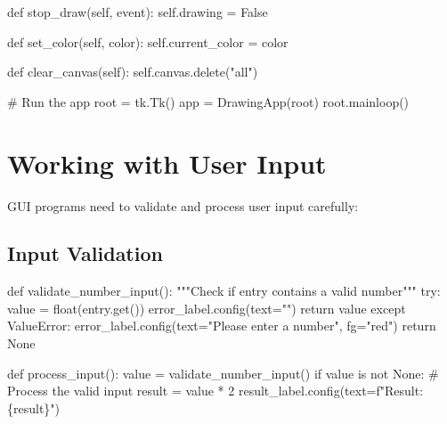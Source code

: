 \documentclass[
  letterpaper,
  DIV=11,
  numbers=noendperiod,
  oneside]{scrreprt}
\newenvironment{Shaded}{}{}
\newcommand{\BuiltInTok}[1]{\textcolor[rgb]{0.84,0.23,0.29}{#1}}
\newcommand{\CommentTok}[1]{\textcolor[rgb]{0.42,0.45,0.49}{#1}}
\newcommand{\ControlFlowTok}[1]{\textcolor[rgb]{0.84,0.23,0.29}{#1}}
\newcommand{\DecValTok}[1]{\textcolor[rgb]{0.00,0.36,0.77}{#1}}
\newcommand{\KeywordTok}[1]{\textcolor[rgb]{0.84,0.23,0.29}{#1}}
\newcommand{\NormalTok}[1]{\textcolor[rgb]{0.14,0.16,0.18}{#1}}
\newcommand{\OperatorTok}[1]{\textcolor[rgb]{0.14,0.16,0.18}{#1}}
\newcommand{\PreprocessorTok}[1]{\textcolor[rgb]{0.84,0.23,0.29}{#1}}
\newcommand{\SpecialCharTok}[1]{\textcolor[rgb]{0.00,0.36,0.77}{#1}}
\newcommand{\SpecialStringTok}[1]{\textcolor[rgb]{0.01,0.18,0.38}{#1}}
\newcommand{\StringTok}[1]{\textcolor[rgb]{0.01,0.18,0.38}{#1}}
\newcommand{\VariableTok}[1]{\textcolor[rgb]{0.89,0.38,0.04}{#1}}
\begin{document}
\begin{Shaded}
\begin{Highlighting}[]
    \KeywordTok{def}\NormalTok{ stop\_draw(}\VariableTok{self}\NormalTok{, event):}
        \VariableTok{self}\NormalTok{.drawing }\OperatorTok{=} \VariableTok{False}
        
    \KeywordTok{def}\NormalTok{ set\_color(}\VariableTok{self}\NormalTok{, color):}
        \VariableTok{self}\NormalTok{.current\_color }\OperatorTok{=}\NormalTok{ color}
        
    \KeywordTok{def}\NormalTok{ clear\_canvas(}\VariableTok{self}\NormalTok{):}
        \VariableTok{self}\NormalTok{.canvas.delete(}\StringTok{"all"}\NormalTok{)}

\CommentTok{\# Run the app}
\NormalTok{root }\OperatorTok{=}\NormalTok{ tk.Tk()}
\NormalTok{app }\OperatorTok{=}\NormalTok{ DrawingApp(root)}
\NormalTok{root.mainloop()}
\end{Highlighting}
\end{Shaded}

\section{Working with User Input}\label{working-with-user-input}

GUI programs need to validate and process user input carefully:

\subsection{Input Validation}\label{input-validation-1}

\begin{Shaded}
\begin{Highlighting}[]
\KeywordTok{def}\NormalTok{ validate\_number\_input():}
    \CommentTok{"""Check if entry contains a valid number"""}
    \ControlFlowTok{try}\NormalTok{:}
\NormalTok{        value }\OperatorTok{=} \BuiltInTok{float}\NormalTok{(entry.get())}
\NormalTok{        error\_label.config(text}\OperatorTok{=}\StringTok{""}\NormalTok{)}
        \ControlFlowTok{return}\NormalTok{ value}
    \ControlFlowTok{except} \PreprocessorTok{ValueError}\NormalTok{:}
\NormalTok{        error\_label.config(text}\OperatorTok{=}\StringTok{"Please enter a number"}\NormalTok{, fg}\OperatorTok{=}\StringTok{"red"}\NormalTok{)}
        \ControlFlowTok{return} \VariableTok{None}

\KeywordTok{def}\NormalTok{ process\_input():}
\NormalTok{    value }\OperatorTok{=}\NormalTok{ validate\_number\_input()}
    \ControlFlowTok{if}\NormalTok{ value }\KeywordTok{is} \KeywordTok{not} \VariableTok{None}\NormalTok{:}
        \CommentTok{\# Process the valid input}
\NormalTok{        result }\OperatorTok{=}\NormalTok{ value }\OperatorTok{*} \DecValTok{2}
\NormalTok{        result\_label.config(text}\OperatorTok{=}\SpecialStringTok{f"Result: }\SpecialCharTok{\{}\NormalTok{result}\SpecialCharTok{\}}\SpecialStringTok{"}\NormalTok{)}
\end{Highlighting}
\end{Shaded}
\end{document}
